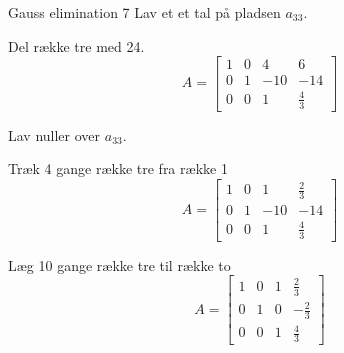 \documentclass{article}
\begin{document}
\begin{exercise}{Gauss elimination 7}
	\hint
	Lav et et tal på pladsen $a_{33}$.

	\hint
	Del række tre med 24.
	\[
	A = \left[\begin{array}{rrr|r}
	1 & 0 & 4 & 6 \\
	0 & 1 & -10 & -14 \\
	0 & 0 & 1 & \frac{4}{3}
	\end{array} \right]
	\]
	
	\hint
	Lav nuller over $a_{33}$.
	
	\hint
	Træk 4 gange række tre fra række 1
	\[
	A = \left[\begin{array}{rrr|r}
	1 & 0 & 1 & \frac{2}{3} \\
	0 & 1 & -10 & -14 \\
	0 & 0 & 1 & \frac{4}{3}
	\end{array} \right]
	\]
	
	\hint
	Læg 10 gange række tre til række to
	\[
	A = \left[\begin{array}{rrr|r}
	1 & 0 & 1 & \frac{2}{3} \\
	0 & 1 & 0 & -\frac{2}{3} \\
	0 & 0 & 1 & \frac{4}{3}
	\end{array} \right]
	\]
	
	
\end{exercise}

\newpage
\end{document}
